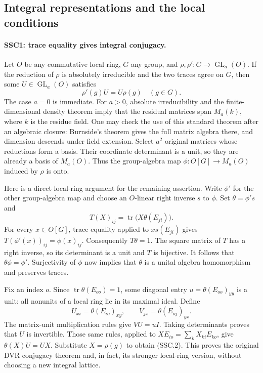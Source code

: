 \subsection{Integral representations and the local conditions}

\paragraph{SSC1: trace equality gives integral conjugacy.}
\label{claim:SSC1}
Let $O$ be any commutative local ring, $G$ any group, and
$\rho,\rho':G\to\operatorname{GL}_a(O)$. If the reduction of
$\rho$ is absolutely irreducible and the two traces agree on $G$,
then some $U\in\operatorname{GL}_a(O)$ satisfies
\[
                    \rho'(g)U=U\rho(g)\quad(g\in G).             \tag{SSC.2}
\]
The case $a=0$ is immediate. For $a>0$, absolute irreducibility
and the finite-dimensional density theorem imply that the residual
matrices span $M_a(k)$, where $k$ is the residue field. One may
check the use of this standard theorem after an algebraic closure:
Burnside's theorem gives the full matrix algebra there, and dimension
descends under field extension. Select $a^2$ original matrices whose
reductions form a basis. Their coordinate determinant is a unit, so
they are already a basis of $M_a(O)$. Thus the group-algebra map
$\phi:O[G]\to M_a(O)$ induced by $\rho$ is onto.

Here is a direct local-ring argument for the remaining assertion.
Write $\phi'$ for the other group-algebra map and choose an
$O$-linear right inverse $s$ to $\phi$. Set $\theta=\phi's$ and
\[
 T(X)_{ij}=\operatorname{tr}\bigl(X\theta(E_{ji})\bigr).
\]
For every $x\in O[G]$, trace equality applied to $xs(E_{ji})$
gives $T(\phi'(x))_{ij}=\phi(x)_{ij}$. Consequently
$T\theta=1$. The square matrix of $T$ has a right inverse,
so its determinant is a unit and $T$ is bijective. It follows that
$\theta\phi=\phi'$. Surjectivity of $\phi$ now implies that
$\theta$ is a unital algebra homomorphism and preserves traces.

Fix an index $o$. Since $\operatorname{tr}\theta(E_{oo})=1$,
some diagonal entry $u=\theta(E_{oo})_{yy}$ is a unit: all
nonunits of a local ring lie in its maximal ideal. Define
\[
 U_{xi}=\theta(E_{io})_{xy},\qquad
 V_{jx}=\theta(E_{oj})_{yx}.
\]
The matrix-unit multiplication rules give $VU=uI$. Taking
determinants proves that $U$ is invertible. Those same rules,
applied to $XE_{io}=\sum_k X_{ki}E_{ko}$, give
$\theta(X)U=UX$. Substitute $X=\rho(g)$ to obtain (SSC.2).
This proves the original DVR conjugacy theorem and, in fact, its
stronger local-ring version, without choosing a new integral lattice.

